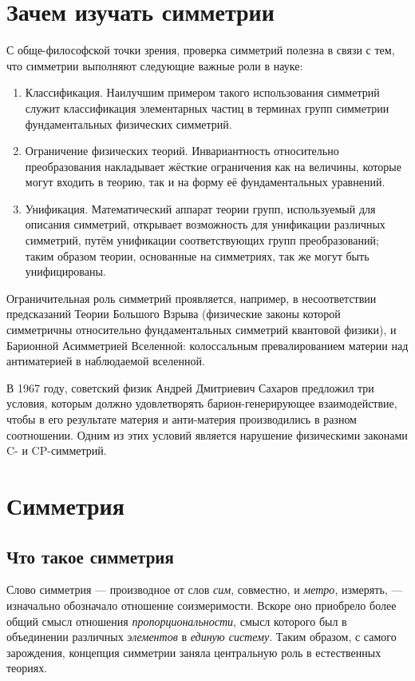 \documentclass[14pt]{extarticle}
\begin{document}


\tableofcontents
\pagebreak

\section*{Зачем изучать симметрии}

С обще-философской точки зрения, проверка симметрий полезна в связи с тем, что симметрии выполняют следующие важные роли в науке:
\begin{enumerate}
	\item Классификация. Наилучшим примером такого использования симметрий служит классификация элементарных частиц в терминах групп симметрии фундаментальных физических симметрий. 
	\item Ограничение физических теорий. Инвариантность относительно преобразования накладывает жёсткие ограничения как на величины, которые могут входить в теорию, так и на форму её фундаментальных уравнений.
	\item Унификация. Математический аппарат теории групп, используемый для описания симметрий, открывает возможность для унификации различных симметрий, путём унификации соответствующих групп преобразований; таким образом теории, основанные на симметриях, так же могут быть унифицированы.
\end{enumerate}

Ограничительная роль симметрий проявляется, например, в несоответствии предсказаний Теории Большого Взрыва (физические законы которой симметричны относительно фундаментальных симметрий квантовой физики), и Барионной Асимметрией Вселенной: колоссальным превалированием материи над антиматерией в наблюдаемой вселенной.

В 1967 году, советский физик Андрей Дмитриевич Сахаров предложил три условия, которым должно удовлетворять барион-генерирующее взаимодействие, чтобы в его результате материя и анти-материя производились в разном соотношении. Одним из этих условий является нарушение физическими законами C- и CP-симметрий.

\section{Симметрия}
\subsection{Что такое симметрия}

Слово симметрия --- производное от слов \emph{сим}, совместно, и \emph{метро}, измерять, --- изначально обозначало отношение соизмеримости. Вскоре оно приобрело более общий смысл отношения \emph{пропорциональности}, смысл которого был в объединении различных \emph{элементов} в \emph{единую систему}. Таким образом, с самого зарождения, концепция симметрии заняла центральную роль в естественных теориях.~\cite{SEP.Symmetry}
\end{document}
